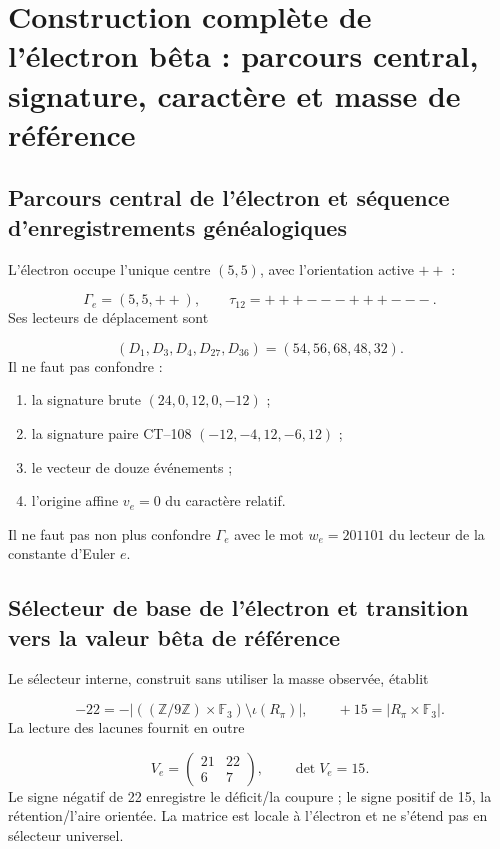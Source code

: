 \section{Construction complète de l'électron bêta : parcours central, signature, caractère et masse de référence}
\subsection{Parcours central de l'électron et séquence d'enregistrements généalogiques}
L'électron occupe l'unique centre \((5,5)\), avec l'orientation active \(++\) :

\[
 \Gamma_e=(5,5,++),\qquad
 \tau_{12}=+++---+++---.
\]
Ses lecteurs de déplacement sont

\[
 (D_1,D_3,D_4,D_{27},D_{36})=(54,56,68,48,32).
\]
Il ne faut pas confondre :

\begin{enumerate}
\item la signature brute \((24,0,12,0,-12)\) ;
\item la signature paire CT--108 \((-12,-4,12,-6,12)\) ;
\item le vecteur de douze événements ;
\item l'origine affine \(v_e=0\) du caractère relatif.
\end{enumerate}
Il ne faut pas non plus confondre \(\Gamma_e\) avec le mot \(w_e=201101\) du lecteur de la constante d'Euler \(e\).

\subsection{Sélecteur de base de l'électron et transition vers la valeur bêta de référence}
Le sélecteur interne, construit sans utiliser la masse observée, établit

\[
 -22=-\left|((\mathbb Z/9\mathbb Z)\times\mathbb F_3)\setminus\iota(R_\pi)\right|,
 \qquad
 +15=|R_\pi\times\mathbb F_3|.
\]
La lecture des lacunes fournit en outre

\[
 V_e=\begin{pmatrix}21&22\\6&7\end{pmatrix},\qquad
 \det V_e=15.
\]
Le signe négatif de 22 enregistre le déficit/la coupure ; le signe positif de 15, la rétention/l'aire orientée. La matrice est locale à l'électron et ne s'étend pas en sélecteur universel.

